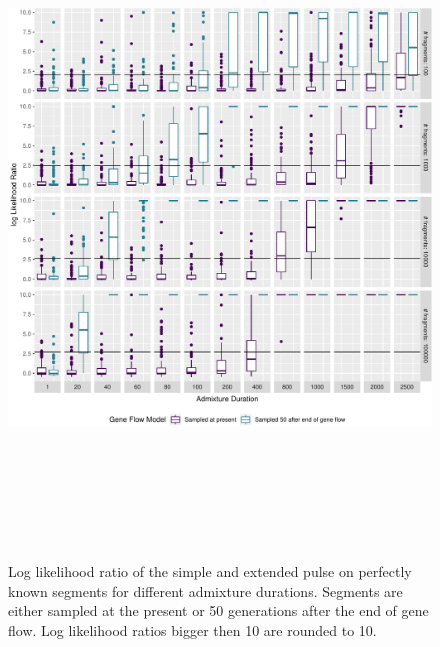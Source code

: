 \documentclass[11pt]{article}
\begin{document}
\begin{figure}
\centering
\includegraphics[width=16cm,height=18cm,keepaspectratio]{ATE_Revisions_files/figure-latex/figR2-1.pdf}
\caption{\label{fig:fig1_1} Log likelihood ratio of the simple and extended pulse on perfectly known segments for different admixture durations. Segments are either sampled at the present or 50 generations after the end of gene flow. Log likelihood ratios bigger then 10 are rounded to 10.}
\end{figure}
\end{document}
